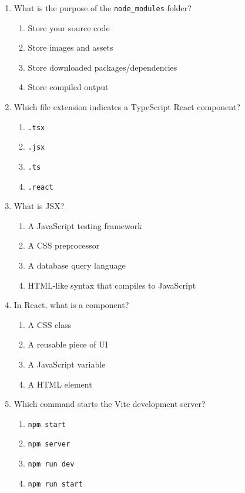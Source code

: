 \documentclass[12pt,a4paper]{article}
\begin{document}
\begin{enumerate}
\item What is the purpose of the \texttt{node\_modules} folder?
\begin{enumerate}[label=\Alph*)]
    \item Store your source code
    \item Store images and assets
    \item Store downloaded packages/dependencies
    \item Store compiled output
\end{enumerate}

\item Which file extension indicates a TypeScript React component?
\begin{enumerate}[label=\Alph*)]
    \item \texttt{.tsx}
    \item \texttt{.jsx}
    \item \texttt{.ts}
    \item \texttt{.react}
\end{enumerate}

\item What is JSX?
\begin{enumerate}[label=\Alph*)]
    \item A JavaScript testing framework
    \item A CSS preprocessor
    \item A database query language
    \item HTML-like syntax that compiles to JavaScript
\end{enumerate}

\item In React, what is a component?
\begin{enumerate}[label=\Alph*)]
    \item A CSS class
    \item A reusable piece of UI
    \item A JavaScript variable
    \item A HTML element
\end{enumerate}

\item Which command starts the Vite development server?
\begin{enumerate}[label=\Alph*)]
    \item \texttt{npm start}
    \item \texttt{npm server}
    \item \texttt{npm run dev}
    \item \texttt{npm run start}
\end{enumerate}


\end{enumerate}
\end{document}
